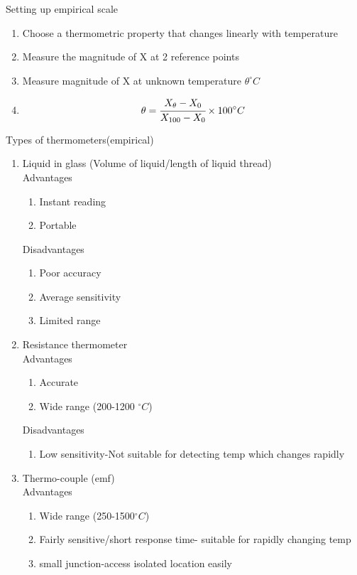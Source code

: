 \documentclass{article}
\begin{document}
\begin{flushleft}
Setting up empirical scale
\end{flushleft}
\begin{enumerate}
    \item Choose a thermometric property that changes linearly with temperature
    \item Measure the magnitude of X at 2 reference points 
    \item Measure magnitude of X at unknown temperature $\theta ^\circ C$
    \item $$\theta = \cfrac{X_\theta-X_0}{X_{100}-X_0}\times 100^\circ C$$
\end{enumerate}
\begin{flushleft}
Types of thermometers(empirical)
\end{flushleft}
\begin{enumerate}
    \item Liquid in glass (Volume of liquid/length of liquid thread)
    \\Advantages
    \begin{enumerate}
        \item Instant reading
        \item Portable
    \end{enumerate}
    Disadvantages
    \begin{enumerate}
        \item Poor accuracy
        \item Average sensitivity
        \item Limited range
    \end{enumerate}
    \item Resistance thermometer
    \\Advantages 
    \begin{enumerate}
        \item Accurate
        \item Wide range (200-1200 $^\circ C$)
    \end{enumerate}
    Disadvantages
    \begin{enumerate}
        \item Low sensitivity-Not suitable for detecting temp which changes rapidly
    \end{enumerate}
    \item Thermo-couple (emf)
    \\Advantages
    \begin{enumerate}
        \item Wide range (250-1500$^\circ C$)
        \item Fairly sensitive/short response time- suitable for rapidly changing temp
        \item small junction-access isolated location easily
    \end{enumerate}
\end{enumerate}
\end{document}
